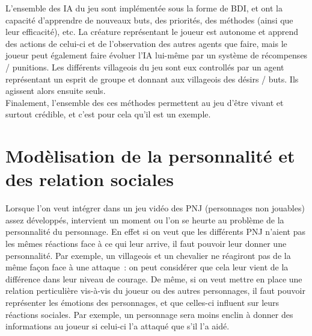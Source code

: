 \documentclass[asi]{picINSA}
\begin{document}
L'ensemble des IA du jeu sont implémentée sous la forme de BDI, et ont la capacité d'apprendre de nouveaux buts, des priorités, des méthodes (ainsi que leur efficacité), etc. La créature représentant le joueur est autonome et apprend des actions de celui-ci et de l'observation des autres agents que faire, mais le joueur peut également faire évoluer l'IA lui-même par un système de récompenses / punitions. Les différents villageois du jeu sont eux controllés par un agent représentant un esprit de groupe et donnant aux villageois des désirs / buts. Ils agissent alors ensuite seuls.\\
Finalement, l'ensemble des ces méthodes permettent au jeu d'être vivant et surtout crédible, et c'est pour cela qu'il est un exemple.



\chapter{Modèlisation de la personnalité et des relation sociales}
Lorsque l'on veut intégrer dans un jeu vidéo des PNJ (personnages non jouables) assez développés, intervient un moment ou l'on se heurte au problème de la personnalité du personnage. En effet si on veut que les différents PNJ n'aient pas les mêmes réactions face à ce qui leur arrive, il faut pouvoir leur donner une personnalité. Par exemple, un villageois et un chevalier ne réagiront pas de la même façon face à une attaque : on peut considérer que cela leur vient de la différence dans leur niveau de courage. De même, si on veut mettre en place une relation perticulière vis-à-vis du joueur ou des autres personnages, il faut pouvoir représenter les émotions des personnages, et que celles-ci influent sur leurs réactions sociales. Par exemple, un personnage sera moins enclin à donner des informations au joueur si celui-ci l'a attaqué que s’il l'a aidé. 
\end{document}
